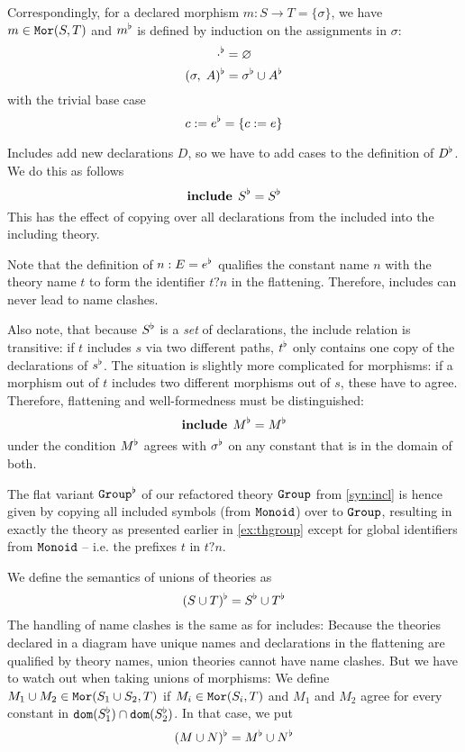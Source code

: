 Correspondingly, for a declared morphism $m:S\to T=\{\sigma\}$, we have $m\in\mathtt{Mor}(S,T)$ and $m^\flat$ is defined by induction on the assignments in $\sigma$:
 \[\cdot^\flat=\varnothing\]
 \[(\sigma,\;A)^\flat=\sigma^\flat\cup A^{\flat}\]
with the trivial base case
 \[c:=e^{\flat}=\{c:=e\}\]

\begin{example}\label{sem:incl}
Includes add new declarations $D$, so we have to add cases to the definition of $D^{\flat}$.
We do this as follows
  \[\operatorname{\mathbf{include}}{\;S}^{\flat} = S^\flat\]
This has the effect of copying over all declarations from the included into the including theory.

Note that the definition of $n:E=e^{\flat}$ qualifies the constant name $n$ with the theory name $t$ to form the identifier $t?n$ in the flattening.
Therefore, includes can never lead to name clashes.

Also note, that because $S^\flat$ is a \textit{set} of declarations, the include relation is transitive: if $t$ includes $s$ via two different paths, $t^\flat$ only contains one copy of the declarations of $s^\flat$.
The situation is slightly more complicated for morphisms: if a morphism out of $t$ includes two different morphisms out of $s$, these have to agree.
Therefore, flattening and well-formedness must be distinguished:
  \[\operatorname{\mathbf{include}}{\;M}^{\flat} = M^\flat\]
under the condition $M^\flat$ agrees with $\sigma^\flat$ on any constant that is in the domain of both.

The flat variant $\operatorname{\mathtt{Group}}^\flat$ of our refactored theory $\operatorname{\mathtt{Group}}$ from \autoref{syn:incl} is hence given by copying all included symbols (from $\operatorname{\mathtt{Monoid}}$) over to $\operatorname{\mathtt{Group}}$, resulting in exactly the theory as presented earlier in \autoref{ex:thgroup} except for global identifiers from $\operatorname{\mathtt{Monoid}}$ -- i.e. the prefixes $t$ in $t?n$.
\end{example}

\begin{example}\label{sem:union}
We define the semantics of unions of theories as
\[(S\cup T)^\flat=S^\flat\cup T^\flat\]
The handling of name clashes is the same as for includes:
Because the theories declared in a diagram have unique names and declarations in the flattening are qualified by theory names, union theories cannot have name clashes.
But we have to watch out when taking unions of morphisms:
We define $M_1\cup M_2\in \mathtt{Mor}(S_1\cup S_2,T)$ if $M_i\in\mathtt{Mor}(S_i,T)$ and $M_1$ and $M_2$ agree for every constant in $\mathtt{dom}(S_1^\flat)\cap\mathtt{dom}(S_2^\flat)$.
In that case, we put
\[(M\cup N)^\flat=M^\flat\cup N^\flat\]
\end{example}

